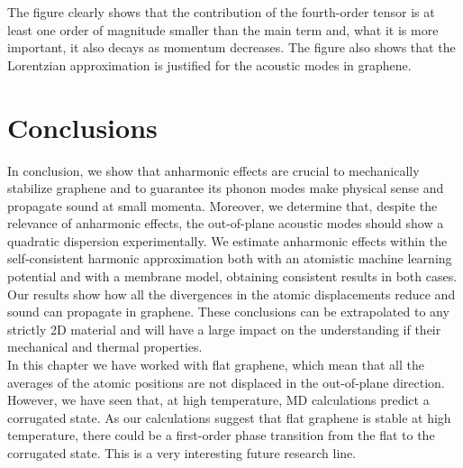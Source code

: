 The figure clearly shows that the contribution of the fourth-order tensor is at least one order of magnitude smaller 
than the main term and, what it is more important, it also decays as momentum decreases. The figure also shows that 
the Lorentzian approximation is justified for the acoustic modes in graphene.

\section{Conclusions}

In conclusion, we show that anharmonic effects are crucial to mechanically stabilize graphene and to guarantee its 
phonon modes make physical sense and propagate sound at small momenta. Moreover, we determine that, despite the 
relevance of anharmonic effects, the out-of-plane acoustic modes should show a quadratic dispersion experimentally. 
We estimate anharmonic effects within the self-consistent harmonic approximation both with an atomistic machine 
learning potential and with a membrane model, obtaining consistent results in both cases. Our results show how all 
the divergences in the atomic displacements reduce and sound can propagate in graphene. These conclusions can 
be extrapolated to any strictly 2D material and will have a large impact on the understanding if their mechanical 
and thermal properties. \\

In this chapter we have worked with flat graphene, which mean that all the averages of the atomic positions are not 
displaced in the out-of-plane direction. However, we have seen that, at high temperature, MD calculations predict a 
corrugated state. As our calculations suggest that flat graphene is stable at high temperature, there could be a 
first-order phase transition from the flat to the corrugated state. This is a very interesting future research line.

